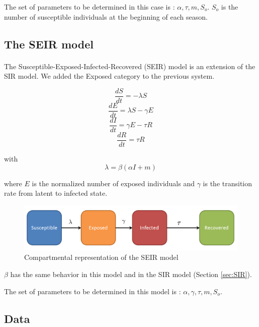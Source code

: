 \documentclass[11pt, a4paper]{article}
\begin{document}
The set of parameters to be determined in this case is : $ {\alpha, \tau, m, S_o}$. $S_o$ is the number of susceptible individuals at the beginning of each season.

\subsection{The SEIR model}
\paragraph{}
The Susceptible-Exposed-Infected-Recovered (SEIR) model is an extension of the SIR model. We added the Exposed category to the previous system.

\begin{equation}
\frac{dS}{dt} = - \lambda S
\end{equation}
\begin{equation}
\frac{dE}{dt} = \lambda S - \gamma E
\end{equation}
\begin{equation}
\frac{dI}{dt} = \gamma E - \tau R
\end{equation}
\begin{equation}
\frac{dR}{dt} = \tau R
\end{equation}

with \[ \lambda = \beta (\alpha I + m) \]

where $E$ is the normalized number of exposed individuals and $\gamma$ is the transition rate from latent to infected state.

\begin{figure}[h]
\FloatBarrier
\center
   \includegraphics[width = \textwidth]{figures/picture2.png}
   \caption{Compartmental representation of the SEIR model}
   \label{SEIRcr}
\end{figure}

$\beta$ has the same behavior in this model and in the SIR model (Section \ref{sec:SIR}).

The set of parameters to be determined in this model is : $ { \alpha, \gamma, \tau, m, S_o}$. 

\subsection{Data}
\end{document}
